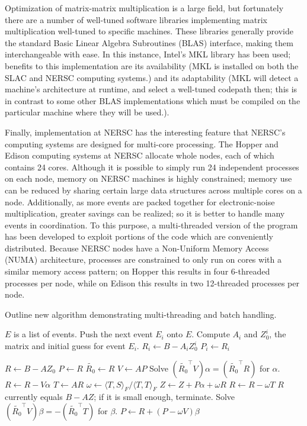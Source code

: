 Optimization of matrix-matrix multiplication is a large field, but fortunately there are a number of well-tuned software libraries implementing matrix multiplication well-tuned to specific machines.  These libraries generally provide the standard Basic Linear Algebra Subroutines (BLAS) interface, making them interchangeable with ease.  In this instance, Intel's MKL library has been used; benefits to this implementation are its availability (MKL is installed on both the SLAC and NERSC computing systems.) and its adaptability (MKL will detect a machine's architecture at runtime, and select a well-tuned codepath then; this is in contrast to some other BLAS implementations which must be compiled on the particular machine where they will be used.).

Finally, implementation at NERSC has the interesting feature that NERSC's computing systems are designed for multi-core processing.  The Hopper and Edison computing systems at NERSC allocate whole nodes, each of which contains 24 cores.  Although it is possible to simply run 24 independent processes on each node, memory on NERSC machines is highly constrained; memory use can be reduced by sharing certain large data structures across multiple cores on a node.  Additionally, as more events are packed together for electronic-noise multiplication, greater savings can be realized; so it is better to handle many events in coordination.  To this purpose, a multi-threaded version of the program has been developed to exploit portions of the code which are conveniently distributed.  Because NERSC nodes have a Non-Uniform Memory Access (NUMA) architecture, processes are constrained to only run on cores with a similar memory access pattern; on Hopper this results in four 6-threaded processes per node, while on Edison this results in two 12-threaded processes per node.


Outline new algorithm demonstrating multi-threading and batch handling.

\begin{algorithmic}
\STATE $E$ is a list of events.
  \STATE Push the next event $E_i$ onto $E$.
  \STATE Compute $A_i$ and $Z_0^i$, the matrix and initial guess for event $E_i$.
  \STATE $R_i \gets B-A_i Z_0^i$
  \STATE $P_i \gets R_i$
\ENDWHILE

\STATE $R \gets B-AZ_0$
\STATE $P \gets R$
\STATE $\widetilde{R_0} \gets R$
  \STATE $V \gets AP$
  \STATE Solve $(\widetilde{R_0}^\top V)\alpha = (\widetilde{R_0}^\top R)$ for $\alpha$.
  \STATE $R \gets R - V\alpha$
  \STATE $T \gets AR$
  \STATE $\omega \gets {\langle T,S\rangle_F} / {\langle T,T\rangle_F} $
  \STATE $Z \gets Z + P\alpha + \omega R$
  \STATE $R \gets R - \omega T$
  \STATE $R$ currently equals $B-AZ$; if it is small enough, terminate.
  \STATE Solve $(\widetilde{R_0}^\top V)\beta = -(\widetilde{R_0}^\top T)$ for $\beta$.
  \STATE $P \gets R + (P - \omega V) \beta$
\ENDWHILE
\end{algorithmic}




